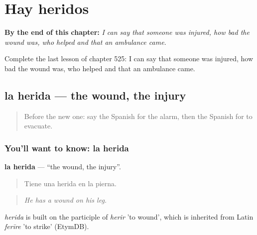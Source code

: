 
\chapter{Hay heridos}
\label{ch:es-hay-heridos}

\begin{chapteropening}
\textbf{By the end of this chapter:} \emph{I can say that someone was injured, how bad the wound was, who helped and that an ambulance came.}

Complete the last lesson of chapter 525: I can say that someone was injured, how bad the wound was, who helped and that an ambulance came.
\end{chapteropening}

\section[la herida]{la herida — the wound, the injury}

\label{lesson:ES-C525-herida}



\begin{quote}
Before the new one: say the Spanish for the alarm, then the Spanish for to evacuate.
\end{quote}

\subsection*{You'll want to know: la herida}
\textbf{la herida} — \textquotedblleft{}the wound, the injury\textquotedblright{}.

\begin{quote}
Tiene una herida en la pierna.
\end{quote}

\begin{quote}
\emph{He has a wound on his leg.}
\end{quote}

\begin{cousinweb}
\emph{herida} is built on the participle of \emph{herir} 'to wound', which is inherited from Latin \emph{ferīre} 'to strike' (EtymDB).
\end{cousinweb}

